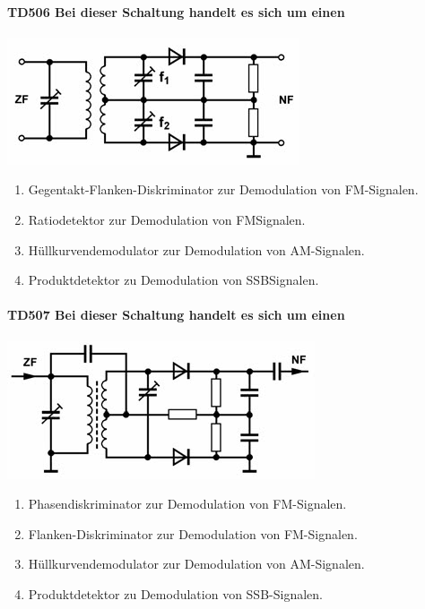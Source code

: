 \documentclass[8pt]{article}
\begin{document}
\begin{enumerate}
\begin{enumerate}[nolistsep,label=\Alph*]
\paragraph*{TD506 Bei dieser Schaltung handelt es sich um einen} 
\begin{center}
	\begin{minipage}{\linewidth}
		\centering
		\includegraphics[scale=1.0]{pics/td506_a.jpg}
	\end{minipage}
\end{center}
\begin{enumerate}[nolistsep,label=\Alph*]
\item Gegentakt-Flanken-Diskriminator zur Demodulation von FM-Signalen.
\item Ratiodetektor zur Demodulation von FMSignalen. 
\item Hüllkurvendemodulator zur Demodulation von AM-Signalen.
\item Produktdetektor zu Demodulation von SSBSignalen.
\end{enumerate}

\paragraph*{TD507 Bei dieser Schaltung handelt es sich um einen} 
\begin{center}
	\begin{minipage}{\linewidth}
		\centering
		\includegraphics[scale=1.0]{pics/td507_a.jpg}
	\end{minipage}
\end{center}
\begin{enumerate}[nolistsep,label=\Alph*]
\item Phasendiskriminator zur Demodulation von FM-Signalen.
\item Flanken-Diskriminator zur Demodulation von FM-Signalen.
\item Hüllkurvendemodulator zur Demodulation von AM-Signalen.
\item Produktdetektor zu Demodulation von SSB-Signalen.
\end{enumerate}


\end{enumerate}
\end{enumerate}
\end{document}
